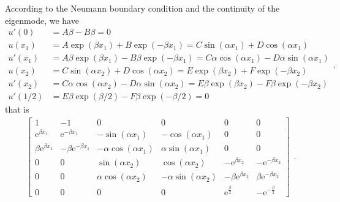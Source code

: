 \documentclass[a4paper,11pt]{article}
\begin{document}
\begin{appendices}
According to the Neumann boundary condition and the continuity of the eigenmode, we have
\begin{equation*}
\begin{split}
u'(0) & = A \beta - B \beta = 0 \\
u(x_1) & = A \exp(\beta x_1) + B \exp(-\beta x_1) = C \sin(\alpha x_1) + D \cos(\alpha x_1) \\
u'(x_1) & = A \beta \exp(\beta x_1) - B \beta \exp(-\beta x_1) = C \alpha \cos(\alpha x_1) - D \alpha \sin(\alpha x_1) \\
u(x_2) & = C \sin(\alpha x_2) + D \cos(\alpha x_2) = E \exp(\beta x_2) + F \exp(-\beta x_2) \\
u'(x_2) & = C \alpha \cos(\alpha x_2) - D \alpha \sin(\alpha x_2) = E \beta \exp(\beta x_2) - F \beta \exp(-\beta x_2) \\
u'(1/2) & = E \beta \exp(\beta/2) - F \beta \exp(-\beta/2) = 0
\end{split},
\end{equation*}
that is
\begin{equation*}
\begin{split}
\left[\begin{array}{cccccc} 1 & -1 & 0 & 0 & 0 & 0\\ \mathrm{e}^{\beta x_1} & \mathrm{e}^{- \beta x_1} & - \sin\!\left(\alpha x_1\right) & - \cos\!\left(\alpha x_1\right) & 0 & 0\\ \beta \mathrm{e}^{\beta x_1} & - \beta \mathrm{e}^{- \beta x_1} & - \alpha \cos\!\left(\alpha x_1\right) & \alpha \sin\!\left(\alpha x_1\right) & 0 & 0\\ 0 & 0 & \sin\!\left(\alpha x_2\right) & \cos\!\left(\alpha x_2\right) & - \mathrm{e}^{\beta x_2} & - \mathrm{e}^{- \beta x_2}\\ 0 & 0 & \alpha \cos\!\left(\alpha x_2\right) & - \alpha \sin\!\left(\alpha x_2\right) & - \beta \mathrm{e}^{\beta x_2} & \beta \mathrm{e}^{- \beta x_2}\\ 0 & 0 & 0 & 0 & \mathrm{e}^{\frac{\beta}{2}} & - \mathrm{e}^{-\frac{\beta}{2}} \end{array}\right]
\end{split}.
\end{equation*}


\end{appendices}
\end{document}
